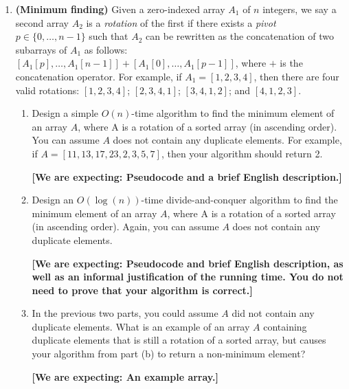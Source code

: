 \documentclass{article}
\begin{document}
\begin{enumerate}
  \item \textbf{(Minimum finding)} Given a zero-indexed array $A_1$ of $n$
    integers, we say a second array $A_2$ is a \textit{rotation} of the first
    if there exists a \textit{pivot} $p \in \{0, \ldots, n-1\}$ such that $A_2$
    can be rewritten as the concatenation of two subarrays of $A_1$ as follows: 
    $[A_1[p], \ldots, A_1[n-1]] + [A_1[0], \ldots, A_1[p-1]]$, where $+$ is the
    concatenation operator. For example, if $A_1 = [1, 2, 3, 4]$, then there are
    four valid rotations: $[1, 2, 3, 4]$; $[2, 3, 4, 1]$; $[3, 4, 1, 2]$; and
    $[4, 1, 2, 3]$.
    
    \begin{enumerate}
      \item Design a simple $O(n)$-time algorithm to find the minimum element
        of an array $A$, where A is a rotation of a sorted array (in ascending
        order). You can assume $A$ does not contain any duplicate elements. For
        example, if $A = [11, 13, 17, 23, 2, 3, 5, 7]$, then your algorithm
        should return 2.

        \textbf{[We are expecting: Pseudocode and a brief English description.]}
      \item Design an $O(\log(n))$-time divide-and-conquer algorithm to find the minimum element
        of an array $A$, where A is a rotation of a sorted array (in ascending
        order). Again, you can assume $A$ does not contain
        any duplicate elements.

        \textbf{[We are expecting: Pseudocode and brief English description, as
        well as an informal justification of the running time. You do not need
        to prove that your algorithm is correct.]}
      \item In the previous two parts, you could assume $A$ did not contain any
        duplicate elements. What is an example of an array $A$ containing
        duplicate elements that is still a rotation of a sorted array, but
        causes your algorithm from part (b) to return a non-minimum element?

        \textbf{[We are expecting: An example array.]}
    \end{enumerate}
\end{enumerate}
\end{document}
